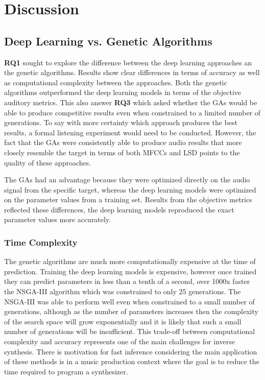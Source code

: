 \section{Discussion}
\label{sec:inverse-synth-discuss}

\subsection{Deep Learning vs. Genetic Algorithms}
\textbf{RQ1} sought to explore the difference between the deep learning approaches an the genetic algorithms. Results show clear differences in terms of accuracy as well as computational complexity between the approaches. Both the genetic algorithms outperformed the deep learning models in terms of the objective auditory metrics. This also answer \textbf{RQ3} which asked whether the GAs would be able to produce competitive results even when constrained to a limited number of generations. To say with more certainty which approach produces the best results, a formal listening experiment would need to be conducted. However, the fact that the GAs were consistently able to produce audio results that more closely resemble the target in terms of both MFCCs and LSD points to the quality of these approaches. 

The GAs had an advantage because they were optimized directly on the audio signal from the specific target, whereas the deep learning models were optimized on the parameter values from a training set. Results from the objective metrics reflected these differences, the deep learning models reproduced the exact parameter values more accurately.

\subsubsection{Time Complexity}
The genetic algorithms are much more computationally expensive at the time of prediction. Training the deep learning models is expensive, however once trained they can predict parameters in less than a tenth of a second, over 1000x faster the NSGA-III algorithm which was constrained to only 25 generations. The NSGA-III was able to perform well even when constrained to a small number of generations, although as the number of parameters increases then the complexity of the search space will grow exponentially and it is likely that such a small number of generations will be insufficient. This trade-off between computational complexity and accuracy represents one of the main challenges for inverse synthesis. There is motivation for fast inference considering the main application of these methods is in a music production context where the goal is to reduce the time required to program a synthesizer.

